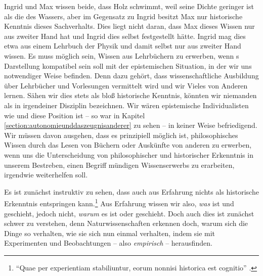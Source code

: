 Ingrid und Max wissen beide, dass Holz schwimmt, weil seine Dichte geringer ist
als die des Wassers, aber im Gegensatz zu Ingrid besitzt Max nur historische
Kenntnis dieses Sachverhalts. Dies liegt nicht daran, dass Max dieses
Wissen nur aus zweiter Hand hat und Ingrid dies selbst festgestellt hätte.
Ingrid mag dies etwa aus einem Lehrbuch der Physik und damit selbst nur aus
zweiter Hand wissen. Es muss möglich sein,  Wissen
aus Lehrbüchern zu erwerben, wenn
s Darstellung
kompatibel sein soll mit der epistemischen Situation, in der wir uns notwendiger
Weise befinden. Denn dazu gehört, dass wissenschaftliche Ausbildung über
Lehrbücher und Vorlesungen vermittelt wird und wir Vieles von Anderen lernen.
Sähen wir dies stets als bloß historische Kenntnis, könnten wir niemanden als
 in irgendeiner Disziplin bezeichnen. Wir wären
epistemische Individualisten wie 
und diese Position ist -- so war in Kapitel \ref{section:autonomieunddaszeugnisanderer} zu sehen -- in
keiner Weise befriedigend. Wir müssen davon ausgehen, dass es prinzipiell
möglich ist, philosophisches Wissen durch das Lesen von Büchern oder Auskünfte
von anderen zu erwerben, wenn uns die Unterscheidung von philosophischer und
historischer Erkenntnis in unserem Bestreben, einen Begriff mündigen
Wissenserwerbs zu erarbeiten, irgendwie weiterhelfen soll.

Es ist zunächst instruktiv zu sehen, dass auch aus Erfahrung nichts als
historische Erkenntnis entspringen
kann.\footnote{\enquote{Quae per experientiam stabiliuntur, eorum nonnisi
historica est cognitio} \parencite[][\S~10]{Wolff:Discursuspraeliminarisdephilosophiaingenere1996}.}
Aus Erfahrung wissen wir also, \emph{was} ist und geschieht, jedoch nicht,
\emph{warum} es ist oder geschieht. Doch auch dies ist zunächst
schwer zu verstehen, denn Naturwissenschaften erkennen doch, warum sich die Dinge so
verhalten, wie sie sich nun einmal verhalten, indem sie mit Experimenten und
Beobachtungen -- also \emph{empirisch} -- herausfinden.


